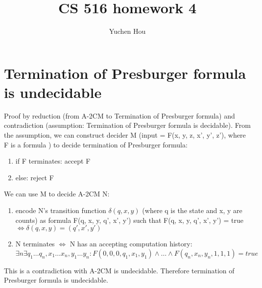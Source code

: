 \documentclass{article}
\begin{document}
\lstset{language=python, tabsize=4}
\title{CS 516 homework 4}
\author{Yuchen Hou}
\maketitle

\section{Termination of Presburger formula is undecidable}
Proof by reduction (from A-2CM to Termination of Presburger formula) and 
contradiction (assumption: Termination of Presburger formula is decidable). 
From the assumption, we can construct decider M (input = F(x, y, z, x', y', 
z'), where F is a formula ) to decide termination of Presburger formula:
\begin{enumerate}
	\item if F terminates: accept F
	\item else: reject F
\end{enumerate}
We can use M to decide A-2CM N:
\begin{enumerate}
	\item encode N's transition function $ \delta(q, x, y) $ 
	(where q is the state and x, y are counts) as formula F(q, x, y, q', x', 
	y') such 
	that F(q, x, y, q', x', y') = true $ \iff \delta(q, x, y) = (q', x', y') $
	\item N terminates $ \iff $ N has an accepting computation history: $ 
	\exists n \exists q_1 \dots q_n, x_1 \dots x_n, y_1 \dots y_n : F(0, 0, 0, 
	q_1, x_1, y_1) \land \dots \land F(q_n, x_n, y_n, 1, 1, 1) = true$
\end{enumerate}
This is a contradiction with A-2CM is undecidable. Therefore termination of 
Presburger formula is undecidable.
\end{document}
